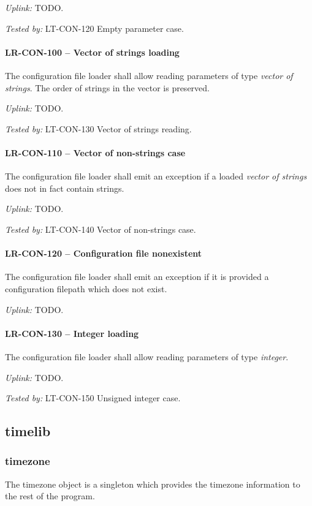 \textit{Uplink: } TODO.

\textit{Tested by: } LT-CON-120 Empty parameter case.

\paragraph{LR-CON-100 -- Vector of strings loading}
The configuration file loader shall allow reading parameters of type
\emph{vector of strings}. The order of strings in the vector is preserved.

\textit{Uplink: } TODO.

\textit{Tested by: } LT-CON-130 Vector of strings reading.

\paragraph{LR-CON-110 -- Vector of non-strings case}
The configuration file loader shall emit an exception if a loaded
\emph{vector of strings} does not in fact contain strings.

\textit{Uplink: } TODO.

\textit{Tested by: } LT-CON-140 Vector of non-strings case.

\paragraph{LR-CON-120 -- Configuration file nonexistent}
The configuration file loader shall emit an exception if it is provided
a configuration filepath which does not exist.

\textit{Uplink: } TODO.

\paragraph{LR-CON-130 -- Integer loading}
The configuration file loader shall allow reading parameters of type
\emph{integer}.

\textit{Uplink: } TODO.

\textit{Tested by: } LT-CON-150 Unsigned integer case.

\subsection{time\textunderscore lib}
\subsubsection{time\textunderscore zone}
The time\textunderscore zone object is a singleton which provides the
timezone information to the rest of the program.

